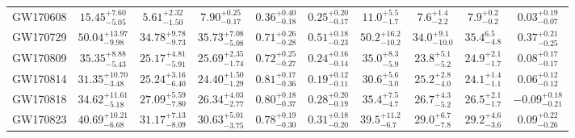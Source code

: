 \begin{table}[t]
\begin{ruledtabular}
\begin{tabular}{cccccccccc}
\vspace{1.0 mm}
GW170608 & $15.45_{-5.05}^{+7.60}$& $5.61_{-1.50}^{+2.32}$& $7.90_{-0.17}^{+0.25}$& $0.36_{-0.18}^{+0.40}$& $0.25_{-0.17}^{+0.20}$&  $11.0_{-1.7}^{+5.5}$             & $7.6_{-2.2}^{+1.4}$              &      $7.9_{-0.2}^{+0.2}$                  &    $0.03_{-0.07}^{+0.19}$           \\
\vspace{1.0 mm}
GW170729 & $50.04_{-9.98}^{+13.97}$& $34.78_{-9.73}^{+9.78}$& $35.73_{-5.08}^{+7.08}$& $0.71_{-0.28}^{+0.26}$& $0.51_{-0.23}^{+0.18}$&  $50.2_{-10.2}^{+16.2}$             &  $34.0_{-10.0}^{+9.1}$             & $35.4_{-4.8}^{6.5}$                      &  $0.37_{-0.25}^{+0.21}$              \\
\vspace{1.0 mm}
GW170809 & $35.35_{-5.43}^{+8.88}$& $25.17_{-5.91}^{+4.81}$& $25.69_{-1.74}^{+2.35}$& $0.72_{-0.27}^{+0.25}$& $0.24_{-0.14}^{+0.16}$&    $35.0_{-5.9}^{+8.3}$           &                 $23.8_{-5.2}^{+5.1}$                     &  $24.9_{-1.7}^{+2.1}$   & $0.08_{-0.17}^{+0.17}$             \\
\vspace{1.0 mm}
GW170814 & $31.35_{-3.48}^{+10.70}$& $25.24_{-6.40}^{+3.16}$& $24.40_{-1.29}^{+1.50}$& $0.81_{-0.36}^{+0.17}$& $0.19_{-0.11}^{+0.12}$&  $30.6_{-3.0}^{+5.6}$             &               $25.2_{-4.0}^{+2.8}$&   $24.1_{-1.1}^{+1.4}$                    &   $0.06_{-0.12}^{+0.12}$           \\
\vspace{1.0 mm}
GW170818 &$34.62_{-5.18}^{+11.61}$& $27.09_{-7.80}^{+5.59}$& $26.34_{-2.77}^{+4.03}$& $0.80_{-0.37}^{+0.18}$& $0.28_{-0.19}^{+0.20}$&   $35.4_{-4.7}^{+7.5}$            &               $26.7_{-5.2}^{+4.3}$& $26.5_{-1.7}^{+2.1}$                      &  $-0.09_{-0.21}^{+0.18}$            \\
\vspace{1.0 mm}
GW170823 & $40.69_{-6.68}^{+10.21}$& $31.17_{-8.09}^{+7.13}$& $30.63_{-3.75}^{+5.01}$& $0.78_{-0.30}^{+0.19}$& $0.31_{-0.20}^{+0.18}$&  $39.5_{-6.7}^{+11.2}$             &               $29.0_{-7.8}^{+6.7}$&   $29.2_{-3.6}^{+4.6}$                    &    $0.09_{-0.26}^{+0.22}$          \\
\end{tabular}
\end{ruledtabular}
\end{table}

